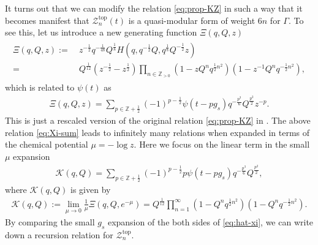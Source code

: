 \documentclass[11pt]{article}
\newcommand{\hf}{\frac{1}{2}}
\def\Ga{\Gamma}
\newcommand{\Ztop}{\mathcal{Z}^{\text{top}}}
\renewcommand{\[}{\begin{eqnarray}}
\renewcommand{\]}{\end{eqnarray}}
\newcommand{\bbZ}{{\mathbb Z}}
\begin{document}
It turns out that we can modify the relation \eqref{eq:prop-KZ}
in such a way that it becomes manifest that
$\Ztop_n(t)$ is a quasi-modular form of weight $6n$ for $\Ga$.
To see this, let us introduce a new generating function
$\Xi(q,Q,z)$
\begin{align}
\begin{aligned}
 \Xi(q,Q,z):=&\ z^{-\frac{1}{2}}q^{-\frac{1}{48}}Q^{\frac{1}{8}}
  H\left(q,q^{-\frac{1}{2}}Q,q^{\frac{1}{8}}Q^{-\frac{1}{2}}z\right)\\
=&\ Q^{\frac{1}{12}}
 \left(z^{-\frac{1}{2}}-z^{\frac{1}{2}}\right)
 \prod_{n\in\bbZ_{> 0}}
 \left(1-zQ^{n}q^{\hf n^2}\right)
 \left(1-z^{-1}Q^{n}q^{-\hf n^2}\right),
\label{eq:Xi-def} 
\end{aligned}
\end{align}
which is related to $\psi(t)$ as
 \begin{align}
 \Xi(q,Q,z)=\sum_{p\in\mathbb{Z}+\hf}(-1)^{p-\hf}
\psi(t-pg_s)q^{-\frac{p^3}{6}}Q^{\frac{p^2}{2}}z^{-p}.
\label{eq:Xi-sum}
\end{align}
This is just a rescaled version of the original relation \eqref{eq:prop-KZ} in \cite{zagier}.
The above relation \eqref{eq:Xi-sum} leads to infinitely many relations when expanded in terms of 
the chemical 
potential $\mu=-\log z$.
Here we focus on the linear term in the small $\mu$ expansion 
\begin{align}
  \mathcal{K}(q,Q)=\sum_{p\in\mathbb{Z}+\hf}(-1)^{p-\hf}
p\psi(t-pg_s)q^{-\frac{p^3}{6}}Q^{\frac{p^2}{2}},
\label{eq:xi-psi}
\end{align}
where 
 $\mathcal{K}(q,Q)$
is given by
\begin{align}
\mathcal{K}(q,Q):=\lim_{\mu\to0}\frac{1}{\mu}\Xi(q,Q,e^{-\mu})=
Q^{\frac{1}{12}}\prod_{n=1}^\infty (1-Q^nq^{\hf n^2})(1-Q^nq^{-\hf n^2}).
\label{eq:hat-xi} 
\end{align}
By comparing the small $g_s$ expansion of the both sides of \eqref{eq:hat-xi},
we can write down a recursion relation for $\Ztop_n$.
\end{document}
